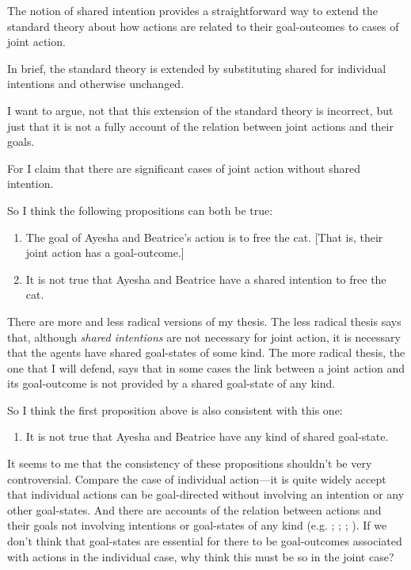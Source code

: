 \documentclass[12pt,a4paper]{extarticle}
\begin{document}
The notion of shared intention provides a straightforward way to extend the standard theory about how actions are related to their goal-outcomes to cases of joint action.

In brief, the standard theory is extended by substituting shared for individual intentions and otherwise unchanged.  

I want to argue, not that this extension of the standard theory is incorrect, but just that it is not a fully account of the relation between joint actions and their goals.

For I claim that there are significant cases of joint action without shared intention.

So I think the following propositions can both be true:

\begin{enumerate}

\item The goal of Ayesha and Beatrice's action is to free the cat.  [That is, their joint action has a goal-outcome.]

\item It is not true that Ayesha and Beatrice have a shared intention to free the cat. 

\end{enumerate}

There are more and less radical versions of my thesis.  The less radical thesis says that, although \emph{shared intentions} are not necessary for joint action, it is necessary that the agents have shared goal-states of some kind.  The more radical thesis, the one that I will defend, says that in some cases the link between a joint action and its goal-outcome is not provided by a shared goal-state of any kind.

So I think the first proposition above is also consistent with this one:

\begin{enumerate}[resume]

\item It is not true that Ayesha and Beatrice have any kind of  shared goal-state.  

\end{enumerate}


It seems to me that the consistency of these propositions shouldn't be very controversial.  Compare the case of individual action---it is quite widely accept that individual actions can be goal-directed without involving an intention or any other goal-states.  
And there are accounts of the relation between actions and their goals not involving intentions or goal-states of any kind 
(e.g.
	\citealp{Bennett:1976rg};
	\citealp{Butterfill:2001kc};
	\citealp{Schueler:2003fk};
	\citealp{Taylor:1964tr}).
If we don't think that goal-states are essential for there to be goal-outcomes associated with actions in the individual case, why think this must be so in the joint case?
\end{document}
